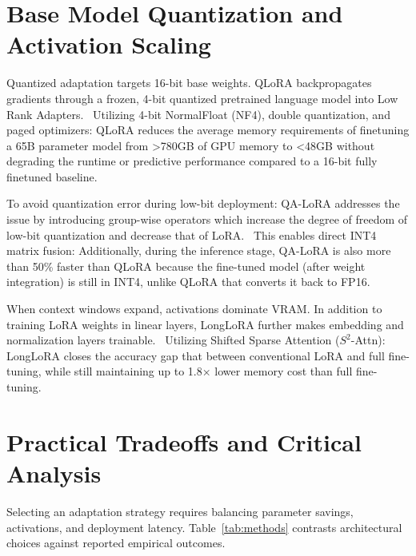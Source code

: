 \documentclass[11pt,a4paper]{article}
\begin{document}
\section{Base Model Quantization and Activation Scaling}

Quantized adaptation targets 16-bit base weights. QLoRA backpropagates gradients through a frozen, 4-bit quantized pretrained language model into Low Rank Adapters.~\cite{dettmers2023qlora} Utilizing 4-bit NormalFloat (NF4), double quantization, and paged optimizers: QLoRA reduces the average memory requirements of finetuning a 65B parameter model from >780GB of GPU memory to <48GB without degrading the runtime or predictive performance compared to a 16-bit fully finetuned baseline.~\cite{dettmers2023qlora}

To avoid quantization error during low-bit deployment: QA-LoRA addresses the issue by introducing group-wise operators which increase the degree of freedom of low-bit quantization and decrease that of LoRA.~\cite{xu2023qa} This enables direct INT4 matrix fusion: Additionally, during the inference stage, QA-LoRA is also more than 50\% faster than QLoRA because the fine-tuned model (after weight integration) is still in INT4, unlike QLoRA that converts it back to FP16.~\cite{xu2023qa}

When context windows expand, activations dominate VRAM. In addition to training LoRA weights in linear layers, LongLoRA further makes embedding and normalization layers trainable.~\cite{chen2023longlora} Utilizing Shifted Sparse Attention ($S^2$-Attn): LongLoRA closes the accuracy gap that between conventional LoRA and full fine-tuning, while still maintaining up to 1.8× lower memory cost than full fine-tuning.~\cite{chen2023longlora}

\section{Practical Tradeoffs and Critical Analysis}

Selecting an adaptation strategy requires balancing parameter savings, activations, and deployment latency. Table~\ref{tab:methods} contrasts architectural choices against reported empirical outcomes.
\end{document}
